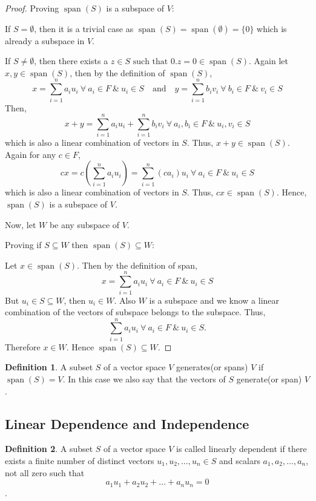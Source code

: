 \documentclass[12pt, a4paper]{article}
\theoremstyle{definition}
\newtheorem{definition}{Definition}[section]
\theoremstyle{remark}
\newcommand{\st}{\text{ such that }}
\DeclareMathOperator{\Span}{span}
\begin{document}
\begin{proof}
    Proving $\Span(S)$ is a subspace of $V$:

    \noindent If $S = \emptyset$, then it is a trivial case as $\Span(S) = \Span(\emptyset) = \{0\}$ which is already a subspace in $V$.

    If $S \ne \emptyset$, then there exists a $z \in S \st 0.z = 0 \in \Span(S)$. Again let $x,y \in \Span(S)$, then by the definition of $\Span(S)$,
    \[
    x = \sum_{i = 1}^{n} a_iu_i \ \forall \ a_i \in F \ \& \ u_i \in S \quad \text{and} \quad y = \sum_{i = 1}^{n} b_iv_i \ \forall \ b_i \in F \ \& \ v_i \in S
    \]
    Then,
    \[
    x + y = \sum_{i = 1}^{n} a_iu_i + \sum_{i = 1}^{n} b_iv_i \ \forall \ a_i, b_i \in F \ \& \ u_i, v_i \in S
    \]
    which is also a linear combination of vectors in $S$. Thus, $x+y \in \Span(S)$. Again for any $c \in F$, 
    \[
    cx = c\left(\sum_{i = 1}^{n} a_iu_i\right) = \sum_{i = 1}^{n} (ca_i)u_i \ \forall \ a_i \in F \ \& \ u_i \in S
    \]
    which is also a linear combination of vectors in $S$. Thus, $cx \in \Span(S)$. Hence, $\Span(S)$ is a subspace of $V$.

    Now, let $W$ be any subspace of $V$.

    \noindent Proving if $S \subseteq W$ then $\Span(S) \subseteq W$:

    Let $x \in \Span(S)$. Then by the definition of span,
    \[
    x = \sum_{i = 1}^{n} a_iu_i \ \forall \ a_i \in F \ \& \ u_i \in S
    \]
    But $u_i \in S \subseteq W$, then $u_i \in W$. Also $W$ is a subspace and we know a linear combination of the vectors of subspace belongs to the subspace. Thus,
    \[
    \sum_{i = 1}^{n} a_iu_i \ \forall \ a_i \in F \ \& \ u_i \in S.
    \]
    Therefore $x \in W$. Hence $\Span(S) \subseteq W$.
\end{proof}

\begin{definition}
    A subset $S$ of a vector space $V$ generates(or spans) $V$ if $\Span(S) = V$. In this case we also say that the vectors of $S$ generate(or span) $V$.
\end{definition}

\subsection{Linear Dependence and Independence}
\begin{definition}
    A subset $S$ of a vector space $V$ is called linearly dependent if there exists a finite number of distinct vectors $u_1, u_2, \ldots, u_n \in S$ and scalars $a_1, a_2, \ldots, a_n$, not all zero such that $$a_1u_1 + a_2u_2 + \ldots + a_nu_n = 0$$.
\end{definition}
\end{document}
